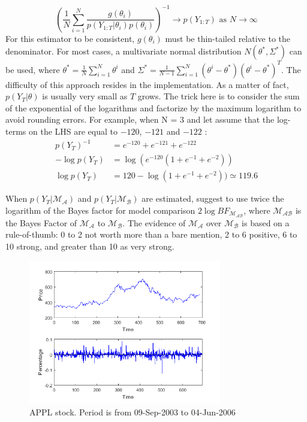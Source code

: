 \documentclass[11pt,a4,twosided,singlespacing,titlepagenumber=on]{scrreprt}
\numberwithin{equation}{chapter} %
\theoremstyle{remark}
\begin{document}
$$\left(\frac{1}{N} \sum_{i=1}^N \frac{g(\theta_i)}{p(Y_{1:T} | \theta_i) p(\theta_i)}\right)^{-1} \rightarrow p(Y_{1:T}) \text{ as } N \rightarrow \infty$$
For this estimator to be consistent, $g(\theta_i)$ must be thin-tailed relative to the denominator. For most cases, a multivariate normal distribution $N(\theta^*, \Sigma^*)$ can be used, where $\theta^* = \frac{1}{N} \sum_{i=1}^N \theta^i$ and $\Sigma^* = \frac{1}{N-1} \sum_{i=1}^N \left(\theta^i - \theta^*\right)\left(\theta^i - \theta^*\right)^T$. The difficulty of this approach resides in the implementation. As a matter of fact, $p(Y_T | \theta)$ is usually very small as $T$ grows. The trick here is to consider the sum of the exponential of the logarithms and factorize by the maximum logarithm to avoid rounding errors. For example, when N = 3 and let assume that the log-terms on the LHS are equal to $-120$, $-121$ and $-122$ :
\begin{align*}
p(Y_T)^{-1} &= e^{-120} + e^{-121} + e^{-122} \\
- \log p(Y_T) &= \log (e^{-120} ( 1 + e^{-1} + e^{-2})) \\
 \log p(Y_T) &= 120 - \log ( 1 + e^{-1} + e^{-2})) \simeq 119.6
\end{align*}

\noindent
When $p(Y_T | \mathcal{M_A})$ and $p(Y_T | \mathcal{M_B})$ are estimated, \cite{kass1995} suggest to use twice the logarithm of the Bayes factor for model comparison $2 \log BF_{\mathcal{M_{AB}}}$, where $\mathcal{M_{AB}}$ is the Bayes Factor of $\mathcal{M_A}$ to $\mathcal{M_B}$. The evidence of $\mathcal{M_A}$ over $\mathcal{M_B}$ is based on a rule-of-thumb: 0 to 2 not worth more than a bare mention, 2 to 6 positive, 6 to 10 strong, and greater than 10 as very strong.


\begin{figure}[htb]
\centering
\includegraphics[width = 0.75\textwidth]{apple_2003_2006}
\caption{APPL stock. Period is from 09-Sep-2003 to 04-Jun-2006}
\label{apple_2003_2006}
\end{figure}
\end{document}
